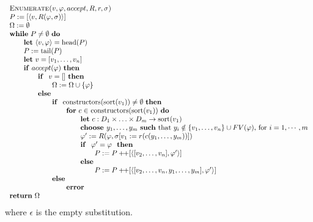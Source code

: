 \documentclass{article}
\newcommand{\concat}{\ensuremath{+\!\!+}}
\begin{document}
\[
\begin{tabular}{l}
\textsc{Enumerate(}$v,\varphi ,accept,R,r,\sigma $\textsc{)} \\
$P:=[\left\langle v,R(\varphi ,\sigma )\right\rangle ]$ \\
$\Omega :=\emptyset $ \\
\textbf{while} $P\neq \emptyset $ \textbf{do} \\
\qquad \textbf{let} $\left\langle v,\varphi \right\rangle =\mathrm{head}(P)$
\\
\qquad $P:=\mathrm{tail}(P)$ \\
\qquad \textbf{let} $v=[v_{1},\ldots ,v_{n}]$ \\
\qquad \textbf{if} $accept(\varphi)$ \textbf{then} \\
\qquad \qquad \textbf{if } $v=[]$ \textbf{then} \\
\qquad \qquad \qquad $\Omega :=\Omega \cup \left\{\varphi \right\}$ \\
\qquad \qquad \textbf{else} \\
\qquad \qquad \qquad \textbf{if } $\mathrm{constructors}(\mathrm{sort} (v_{1}))\neq \emptyset$ \textbf{then} \\
\qquad \qquad \qquad \qquad \textbf{for} $c\in $ $\mathrm{constructors}(\mathrm{sort}(v_{1}))$ \textbf{do} \\
\qquad \qquad \qquad \qquad \qquad \textbf{let} $c:D_{1}\times \ldots \times
D_{m}\rightarrow \mathrm{sort}(v_{1})$ \\
\qquad \qquad \qquad \qquad \qquad \textbf{choose }$y_{1},\ldots ,y_{m}$
\textbf{such} that $y_i \notin \{ v_1, \ldots ,v_n \} \cup FV(\varphi)$, for $i=1, \cdots, m$ \\
\qquad \qquad \qquad \qquad \qquad $\varphi ^{\prime }:=R(\varphi ,\sigma \lbrack v_{1}:=r(c(y_{1},\ldots ,y_{m}))])$ \\
\qquad \qquad \qquad \qquad \qquad \textbf{if } $\varphi^\prime = \varphi$ \textbf{ then} \\
\qquad \qquad \qquad \qquad \qquad \qquad $P:=P\concat\lbrack \left\langle [v_{2},\ldots ,v_{n}],\varphi ^{\prime }\right\rangle ]$ \\
\qquad \qquad \qquad \qquad \qquad \textbf{else} \\
\qquad \qquad \qquad \qquad \qquad \qquad $P:=P\concat\lbrack \left\langle [v_{2},\ldots ,v_{n},y_{1},\ldots ,y_{m}],\varphi ^{\prime }\right\rangle ]$ \\
\qquad \qquad \qquad \textbf{else} \\
\qquad \qquad \qquad \qquad \textbf{error} \\
\textbf{return} $\Omega$
\end{tabular}%
\]%
where $\epsilon $ is the empty substitution.
\end{document}
